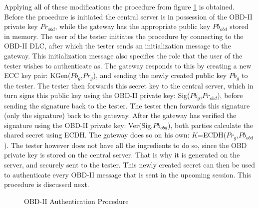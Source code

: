 Applying all of these modifications the procedure from figure \ref{fig:authentication_procedure} is obtained. Before the procedure is initiated the central server is in possession of the OBD-II private key $Pr_{obd}$, while the gateway has the appropriate public key $Pb_{obd}$ stored in memory. The user of the tester initiates the procedure by connecting to the OBD-II DLC, after which the tester sends an initialization message to the gateway. This initialization message also specifies the role that the user of the tester wishes to authenticate as. The gateway responds to this by creating a new ECC key pair: KGen($Pb_g$,$Pr_g$), and sending the newly created public key $Pb_g$ to the tester. The tester then forwards this secret key to the central server, which in turn signs this public key using the OBD-II private key: Sig($Pb_g$,$Pr_{obd}$), before sending the signature back to the tester. The tester then forwards this signature (only the signature) back to the gateway. After the gateway has verified the signature using the OBD-II private key: Ver(Sig,$Pb_{obd}$), both parties calculate the shared secret using ECDH. The gateway does so on his own: $K$=ECDH($Pr_g$,$Pb_{obd}$). The tester however does not have all the ingredients to do so, since the OBD private key is stored on the central server. That is why it is generated on the server, and securely sent to the tester. This newly created secret can then be used to authenticate every OBD-II message that is sent in the upcoming session. This procedure is discussed next.
 
\begin{figure}[h]
	\centering
	\caption{OBD-II Authentication Procedure}
	\label{fig:authentication_procedure}
\end{figure}

